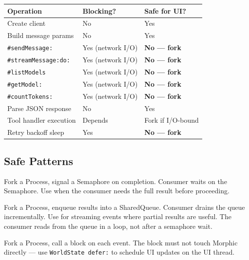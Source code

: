 \documentclass[a4paper,10pt,fleqn]{article}
\newcommand{\sel}[1]{\texttt{\##1}}
\begin{document}
\begin{center}
\begin{tabularx}{\linewidth}{@{}lYl@{}}
\toprule
\textbf{Operation} & \textbf{Blocking?} & \textbf{Safe for UI?} \\
\midrule
Create client              & No  & Yes \\
Build message params       & No  & Yes \\
\sel{sendMessage:}         & Yes (network I/O) & \textbf{No --- fork} \\
\sel{streamMessage:do:}    & Yes (network I/O) & \textbf{No --- fork} \\
\sel{listModels}           & Yes (network I/O) & \textbf{No --- fork} \\
\sel{getModel:}            & Yes (network I/O) & \textbf{No --- fork} \\
\sel{countTokens:}         & Yes (network I/O) & \textbf{No --- fork} \\
Parse JSON response        & No  & Yes \\
Tool handler execution     & Depends & Fork if I/O-bound \\
Retry backoff sleep        & Yes & \textbf{No --- fork} \\
\bottomrule
\end{tabularx}
\end{center}

\subsection{Safe Patterns}

\begin{description}[style=nextline]
  \item[Fork + Semaphore]
    Fork a Process, signal a Semaphore on completion.  Consumer waits on
    the Semaphore.  Use when the consumer needs the full result before
    proceeding.

  \item[Fork + SharedQueue]
    Fork a Process, enqueue results into a SharedQueue.  Consumer drains
    the queue incrementally.  Use for streaming events where partial results
    are useful.  The consumer reads from the queue in a loop, not after
    a semaphore wait.

  \item[Fork + callback]
    Fork a Process, call a block on each event.  The block must not touch
    Morphic directly --- use \texttt{WorldState defer:} to schedule UI
    updates on the UI thread.
\end{description}
\end{document}

